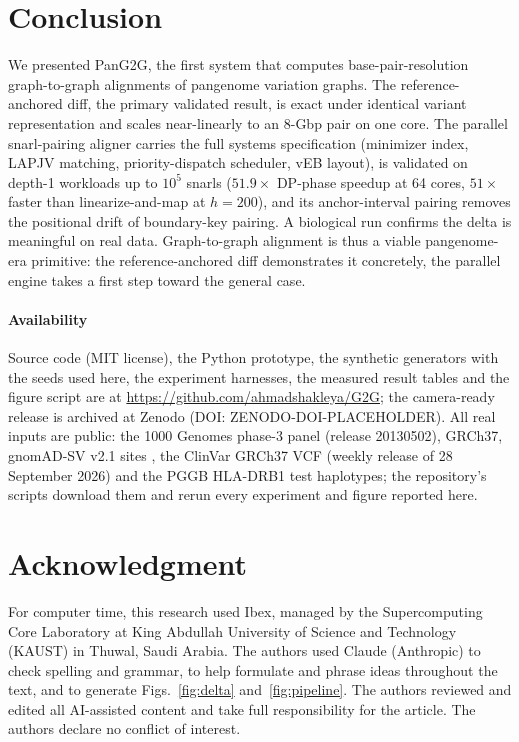 \section{Conclusion}
\label{sec:conclusion}

We presented PanG2G, the first system that computes base-pair-resolution graph-to-graph alignments of pangenome variation graphs. The reference-anchored diff, the primary validated result, is exact under identical variant representation and scales near-linearly to an 8-Gbp pair on one core. The parallel snarl-pairing aligner carries the full systems specification (minimizer index, LAPJV matching, priority-dispatch scheduler, vEB layout), is validated on depth-1 workloads up to $10^5$ snarls ($51.9\times$ DP-phase speedup at 64 cores, $51\times$ faster than linearize-and-map at $h{=}200$), and its anchor-interval pairing removes the positional drift of boundary-key pairing. A biological run confirms the delta is meaningful on real data. Graph-to-graph alignment is thus a viable pangenome-era primitive: the reference-anchored diff demonstrates it concretely, the parallel engine takes a first step toward the general case.

\paragraph{Availability}
Source code (MIT license), the Python prototype, the synthetic generators with the seeds used here, the experiment harnesses, the measured result tables and the figure script are at \url{https://github.com/ahmadshakleya/G2G}; the camera-ready release is archived at Zenodo (DOI: ZENODO-DOI-PLACEHOLDER). All real inputs are public: the 1000 Genomes phase-3 panel (release 20130502), GRCh37, gnomAD-SV v2.1 sites \cite{collins2017svfst}, the ClinVar GRCh37 VCF (weekly release of 28 September 2026) \cite{landrum2018clinvar} and the PGGB HLA-DRB1 test haplotypes; the repository's scripts download them and rerun every experiment and figure reported here.

\section*{Acknowledgment}
For computer time, this research used Ibex, managed by the Supercomputing Core Laboratory at King Abdullah University of Science and Technology (KAUST) in Thuwal, Saudi Arabia. The authors used Claude (Anthropic) to check spelling and grammar, to help formulate and phrase ideas throughout the text, and to generate Figs.~\ref{fig:delta} and~\ref{fig:pipeline}. The authors reviewed and edited all AI-assisted content and take full responsibility for the article. The authors declare no conflict of interest.
